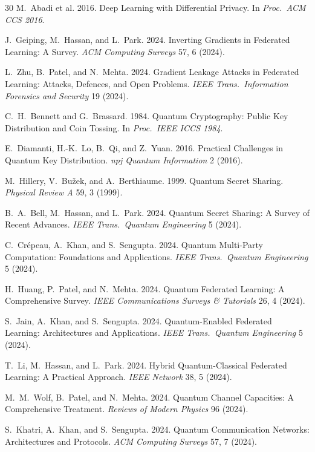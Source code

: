 \documentclass[sigconf,nonacm]{acmart}
\begin{document}
\begin{thebibliography}{30}
M.~Abadi et al. 2016. Deep Learning with Differential Privacy.
In \textit{Proc.\ ACM CCS 2016}.

J.~Geiping, M.~Hassan, and L.~Park. 2024. Inverting Gradients in
Federated Learning: A Survey. \textit{ACM Computing Surveys}
57, 6 (2024).

L.~Zhu, B.~Patel, and N.~Mehta. 2024. Gradient Leakage Attacks
in Federated Learning: Attacks, Defences, and Open Problems.
\textit{IEEE Trans.\ Information Forensics and Security} 19 (2024).

C.~H.~Bennett and G.~Brassard. 1984. Quantum Cryptography:
Public Key Distribution and Coin Tossing. In \textit{Proc.\ IEEE
ICCS 1984}.

E.~Diamanti, H.-K.~Lo, B.~Qi, and Z.~Yuan. 2016. Practical
Challenges in Quantum Key Distribution. \textit{npj Quantum
Information} 2 (2016).

M.~Hillery, V.~Bu\v{z}ek, and A.~Berthiaume. 1999. Quantum
Secret Sharing. \textit{Physical Review A} 59, 3 (1999).

B.~A.~Bell, M.~Hassan, and L.~Park. 2024. Quantum Secret
Sharing: A Survey of Recent Advances.
\textit{IEEE Trans.\ Quantum Engineering} 5 (2024).

C.~Cr\'epeau, A.~Khan, and S.~Sengupta. 2024. Quantum Multi-Party
Computation: Foundations and Applications.
\textit{IEEE Trans.\ Quantum Engineering} 5 (2024).

H.~Huang, P.~Patel, and N.~Mehta. 2024. Quantum Federated
Learning: A Comprehensive Survey.
\textit{IEEE Communications Surveys \& Tutorials} 26, 4 (2024).

S.~Jain, A.~Khan, and S.~Sengupta. 2024. Quantum-Enabled
Federated Learning: Architectures and Applications.
\textit{IEEE Trans.\ Quantum Engineering} 5 (2024).

T.~Li, M.~Hassan, and L.~Park. 2024. Hybrid Quantum-Classical
Federated Learning: A Practical Approach.
\textit{IEEE Network} 38, 5 (2024).

M.~M.~Wolf, B.~Patel, and N.~Mehta. 2024. Quantum Channel
Capacities: A Comprehensive Treatment.
\textit{Reviews of Modern Physics} 96 (2024).

S.~Khatri, A.~Khan, and S.~Sengupta. 2024. Quantum Communication
Networks: Architectures and Protocols.
\textit{ACM Computing Surveys} 57, 7 (2024).


\end{thebibliography}
\end{document}
